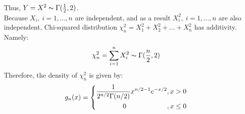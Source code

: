 \documentclass[twoside]{homework}
\begin{document}
Thus, $Y=X^2 \thicksim \Gamma(\frac{1}{2}, 2)$.\\
Because $X_i,\ i=1,...,n$ are independent, and as a result $X_i^2,\ i=1,...,n$ are also independent, Chi-squared distribution $\chi_n^2 = X_1^2 + X_2^2 + ... + X_n^2$ has additivity. Namely:\\
$$\chi_n^2 = \sum_{i=1}^{n} X_i^2 \thicksim \Gamma(\frac{n}{2}, 2)$$
Therefore, the density of $\chi_n^2$ is given by:
\begin{equation}
    \centering
    g_n (x)=
    \left\{  
             \begin{aligned}
             \frac{1}{2^{n/2}\Gamma(n/2)} x^{n/2-1} e^{-x/2}&, x > 0 \\
             0\qquad\qquad\qquad&, x \leq 0
             \end{aligned}
    \right. 
\end{equation}{}\\

\newpage
\end{document}
